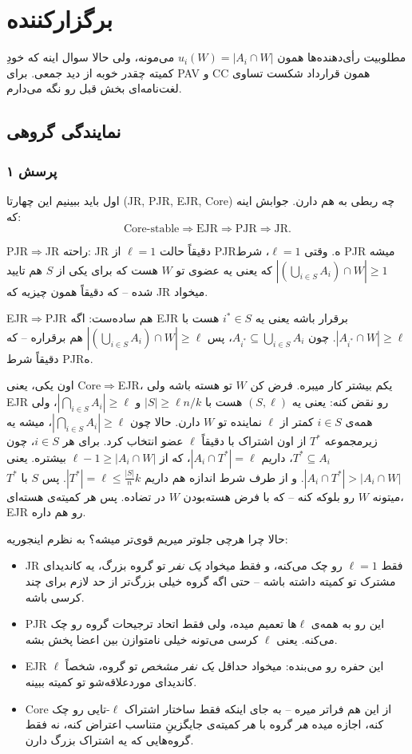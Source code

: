\documentclass[12pt, a4paper]{article}
\begin{document}
\section{برگزارکننده}

مطلوبیت رأی‌دهنده‌ها همون $u_i(W)=|A_i\cap W|$ می‌مونه، ولی حالا سوال اینه که خودِ کمیته چقدر خوبه از دید جمعی. برای PAV و CC همون قرارداد شکست تساوی لغت‌نامه‌ای بخش قبل رو نگه می‌دارم.

\subsection{نمایندگی گروهی}

\subsubsection*{پرسش ۱}

اول باید ببینیم این چهارتا (JR, PJR, EJR, Core) چه ربطی به هم دارن. جوابش اینه که:
\[
\text{Core-stable} \Rightarrow \text{EJR} \Rightarrow \text{PJR} \Rightarrow \text{JR}.
\]

PJR$\Rightarrow$JR راحته: JR دقیقاً حالت $\ell=1$ از PJR‌ه. وقتی $\ell=1$، شرط PJR میشه $|(\bigcup_{i\in S}A_i)\cap W|\ge 1$ که یعنی یه عضوی تو $W$ هست که برای یکی از $S$ هم تایید شده -- که دقیقاً همون چیزیه که JR میخواد.

EJR$\Rightarrow$PJR هم ساده‌ست: اگه EJR برقرار باشه یعنی یه $i^*\in S$ هست با $|A_{i^*}\cap W|\ge\ell$. چون $A_{i^*}\subseteq\bigcup_{i\in S}A_i$، پس $|(\bigcup_{i\in S}A_i)\cap W|\ge\ell$ هم برقراره -- که دقیقاً شرط PJR‌ه.

اون یکی، یعنی Core$\Rightarrow$EJR، یکم بیشتر کار میبره. فرض کن $W$ تو هسته باشه ولی EJR رو نقض کنه: یعنی یه $(S,\ell)$ هست با $|S|\ge\ell n/k$ و $|\bigcap_{i\in S}A_i|\ge\ell$، ولی همه‌ی $i\in S$ کمتر از $\ell$ نماینده تو $W$ دارن. حالا چون $|\bigcap_{i\in S}A_i|\ge\ell$، میشه یه زیرمجموعه $T^*$ از اون اشتراک با دقیقاً $\ell$ عضو انتخاب کرد. برای هر $i\in S$، چون $T^*\subseteq A_i$، داریم $|A_i\cap T^*|=\ell$، که از $\ell-1\ge|A_i\cap W|$ بیشتره. یعنی $|A_i\cap T^*|>|A_i\cap W|$. و از طرف شرط اندازه هم داریم $|T^*|=\ell\le\frac{|S|}{n}k$. پس $S$ با $T^*$ میتونه $W$ رو بلوکه کنه -- که با فرض هسته‌بودن $W$ در تضاده. پس هر کمیته‌ی هسته‌ای، EJR رو هم داره.

حالا چرا هرچی جلوتر میریم قوی‌تر میشه؟ به نظرم اینجوریه:
\begin{itemize}
\item JR فقط $\ell=1$ رو چک می‌کنه، و فقط میخواد \emph{یک نفر} تو گروه بزرگ، یه کاندیدای مشترک تو کمیته داشته باشه -- حتی اگه گروه خیلی بزرگ‌تر از حد لازم برای چند کرسی باشه.
\item PJR این رو به همه‌ی $\ell$ها تعمیم میده، ولی فقط اتحاد ترجیحات گروه رو چک می‌کنه. یعنی $\ell$ کرسی می‌تونه خیلی نامتوازن بین اعضا پخش بشه.
\item EJR این حفره رو می‌بنده: میخواد حداقل \emph{یک نفر مشخص} تو گروه، شخصاً $\ell$ کاندیدای موردعلاقه‌شو تو کمیته ببینه.
\item Core از این هم فراتر میره -- به جای اینکه فقط ساختار اشتراک $\ell$-تایی رو چک کنه، اجازه میده \emph{هر} گروه با \emph{هر} کمیته‌ی جایگزینِ متناسب اعتراض کنه، نه فقط گروه‌هایی که یه اشتراک بزرگ دارن.
\end{itemize}
\end{document}

